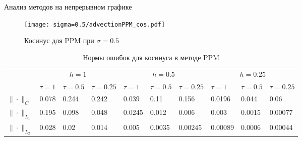 \documentclass[unicode, 8pt]{beamer}
\begin{document}
    \begin{frame}{Анализ методов на непрерывном графике}
        \begin{figure}[h]
            \centering
            \texttt{[image: sigma=0.5/advectionPPM\_cos.pdf]}
            \caption{Косинус для PPM при $ \sigma = 0.5 $}
            \label{fig:ppm_cos_05}
        \end{figure}
        \begin{table}[h]
            \centering
            \caption{Нормы ошибок для косинуса в методе PPM}
            \label{table:cosPPM}
            \scalebox{0.75} {
                \begin{tabular}{|*{10}{C{.45in}|}}
                    \hline
                    &  &  &  \\
                    & $\tau=1$ & $\tau=0.5$ & $\tau=0.25$ & $\tau=1$ & $\tau=0.5$ & $\tau=0.25$ & $\tau=1$ & $\tau=0.5$ & $\tau=0.25$ 
                    \\ \hline
                    $\| \cdot \|_{C}$ & 0.078 & 0.244 & 0.242 & 0.039 & 0.11 & 0.156 & 0.0196 & 0.044 & 0.06 
                    \\ \hline
                    $\| \cdot \|_{L_1}$ & 0.195 & 0.098 & 0.048 & 0.0245 & 0.012 & 0.006 & 0.003 & 0.0015 & 0.00077 
                    \\ \hline
                    $\| \cdot \|_{L_2}$ & 0.028 & 0.02 & 0.014 & 0.005 & 0.0035 & 0.00245 & 0.00089 & 0.0006 & 0.00044
                    \\ \hline
                \end{tabular}
            }
        \end{table}
    \end{frame}
\end{document}
